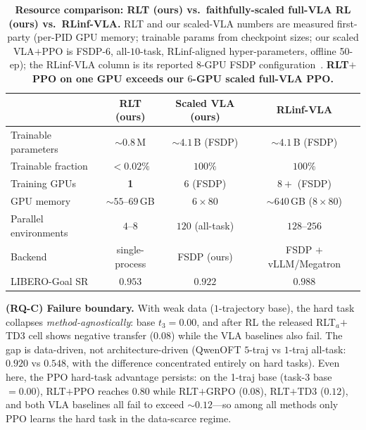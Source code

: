 \begin{table}[t]
    \centering
    \caption{\textbf{Resource comparison: RLT (ours) vs.\ faithfully-scaled full-VLA RL (ours) vs.\ RLinf-VLA.} RLT and our scaled-VLA numbers are measured first-party (per-PID GPU memory; trainable params from checkpoint sizes; our scaled VLA$+$PPO is FSDP-$6$, all-$10$-task, RLinf-aligned hyper-parameters, offline 50-ep); the RLinf-VLA column is its reported $8$-GPU FSDP configuration~\citep{rlinfvla2025}. \textbf{RLT$+$PPO on one GPU exceeds our $6$-GPU scaled full-VLA PPO.}}
    \label{tab:rlt_cost}
    \vspace{0.3em}
    \footnotesize
    \setlength{\tabcolsep}{6pt}
    \renewcommand{\arraystretch}{1.18}
    \begin{tabular}{@{}l ccc@{}}
        \toprule
        & \textbf{RLT (ours)} & \textbf{Scaled VLA (ours)} & \textbf{RLinf-VLA} \\
        \midrule
        Trainable parameters     & $\sim$$0.8$\,M & $\sim$$4.1$\,B (FSDP) & $\sim$$4.1$\,B (FSDP) \\
        Trainable fraction       & $<0.02\%$ & $100\%$ & $100\%$ \\
        Training GPUs            & \textbf{1} & $6$ (FSDP) & $8{+}$ (FSDP) \\
        GPU memory               & $\sim$$55$--$69$\,GB & $6{\times}80$ & $\sim$$640$\,GB ($8{\times}80$) \\
        Parallel environments    & $4$--$8$ & $120$ (all-task) & $128$--$256$ \\
        Backend                  & single-process & FSDP (ours) & FSDP $+$ vLLM/Megatron \\
        \midrule
        LIBERO-Goal SR           & $\mathbf{0.953}$ & $0.922$ & $0.988$ \\
        \bottomrule
    \end{tabular}
\end{table}

\textbf{(RQ-C) Failure boundary.} With weak data ($1$-trajectory base), the hard task collapses \emph{method-agnostically}: base $t_3=0.00$, and after RL the released RLT$_a$$+$TD3 cell shows negative transfer ($0.08$) while the VLA baselines also fail. The gap is data-driven, not architecture-driven (QwenOFT $5$-traj vs $1$-traj all-task: $0.920$ vs $0.548$, with the difference concentrated entirely on hard tasks). Even here, the PPO hard-task advantage persists: on the 1-traj base (task-3 base $=0.00$), RLT$+$PPO reaches $0.80$ while RLT$+$GRPO ($0.08$), RLT$+$TD3 ($0.12$), and both VLA baselines all fail to exceed $\sim0.12$---so among all methods only PPO learns the hard task in the data-scarce regime.

